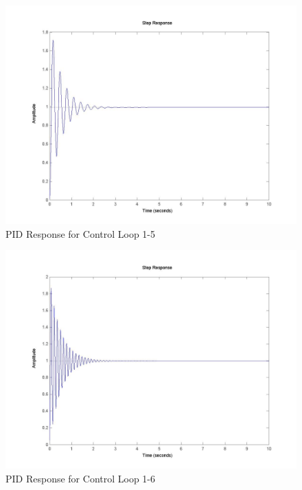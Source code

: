 	\begin{figure}[H]
		\includegraphics[width=\textwidth]{part1-5.jpg}
		\caption{PID Response for Control Loop 1-5}
	\end{figure}
	
	\begin{figure}[H]
		\includegraphics[width=\textwidth]{part1-6.jpg}
		\caption{PID Response for Control Loop 1-6}
	\end{figure}
	
